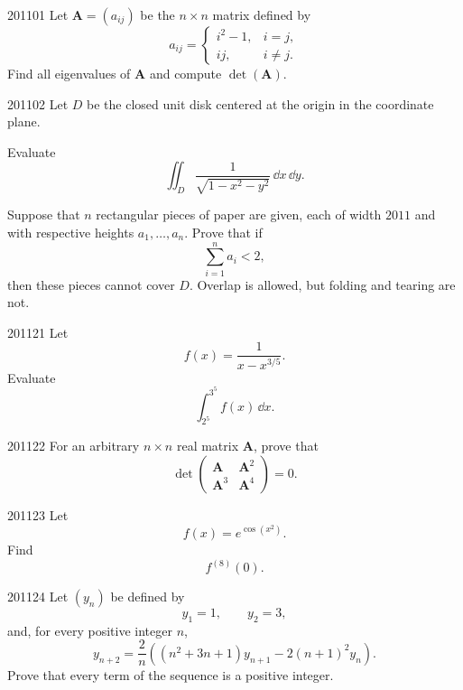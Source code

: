 
\begin{problem}{2011}{0}{1}
Let $\mathbf A=(a_{ij})$ be the $n\times n$ matrix defined by
\[
    a_{ij}
    =
    \begin{cases}
        i^2-1, & i=j, \\
        ij, & i\ne j.
    \end{cases}
\]
Find all eigenvalues of $\mathbf A$ and compute $\det(\mathbf A)$.
\end{problem}

\begin{problem}{2011}{0}{2}
Let $D$ be the closed unit disk centered at the origin in the coordinate plane.
\begin{problemsubparts}
    \item Evaluate
    \[
        \iint_D\frac{1}{\sqrt{1-x^2-y^2}}\, \dd x\, \dd y.
    \]
    \item Suppose that $n$ rectangular pieces of paper are given, each of width $2011$ and with respective heights $a_1, \dots, a_n$. Prove that if
    \[
        \sum_{i=1}^n a_i<2,
    \]
    then these pieces cannot cover $D$. Overlap is allowed, but folding and tearing are not.
\end{problemsubparts}
\end{problem}

\begin{problem}{2011}{2}{1}
Let
\[
    f(x)=\frac{1}{x-x^{3/5}}.
\]
Evaluate
\[
    \int_{2^5}^{3^5} f(x)\, \dd x.
\]
\end{problem}

\begin{problem}{2011}{2}{2}
For an arbitrary $n\times n$ real matrix $\mathbf A$, prove that
\[
    \det
    \begin{pmatrix}
        \mathbf A&\mathbf A^2\\
        \mathbf A^3&\mathbf A^4
    \end{pmatrix}
    =0.
\]
\end{problem}

\begin{problem}{2011}{2}{3}
Let
\[
    f(x)=e^{\cos(x^2)}.
\]
Find
\[
    f^{(8)}(0).
\]
\end{problem}

\begin{problem}{2011}{2}{4}
Let $(y_n)$ be defined by
\[
    y_1=1,
    \qquad
    y_2=3,
\]
and, for every positive integer $n$,
\[
    y_{n+2}
    =\frac2n\left((n^2+3n+1)y_{n+1}-2(n+1)^2y_n\right).
\]
Prove that every term of the sequence is a positive integer.
\end{problem}

